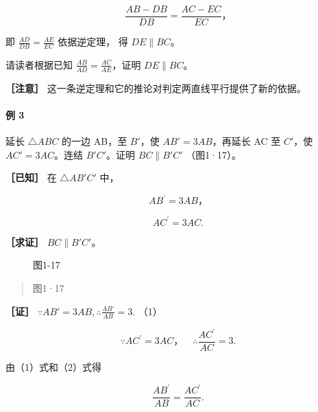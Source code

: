 \[
\frac {A B - D B}{D B} = \frac {A C - E C}{E C}\text{，}
\]

即 \(\frac{AD}{DB} = \frac{AE}{EC}\) 依据逆定理， 得
\(DE \parallel BC\)。

请读者根据已知 \(\frac{AB}{AD} = \frac{AC}{AE}\)，证明
\(DE \parallel BC\)。

\textbf{［注意］} 这一条逆定理和它的推论对判定两直线平行提供了新的依据。

\paragraph{例 3}

延长 \(\triangle ABC\) 的一边 AB，至 \(B'\)，使 \(AB' = 3AB\)，再延长 AC
至 \(C'\)，使 \(AC' = 3AC\)。连结 \(B'C'\)。证明 \(BC \parallel B'C'\)
（图1·17）。

\textbf{［已知］} 在 \(\triangle AB'C'\) 中，

\[
A B ^ {\prime} = 3 A B\text{，}
\]

\[
A C ^ {\prime} = 3 A C.
\]

\textbf{［求证］} \(BC \parallel B'C'\)。

\begin{figure}
\centering
{}
\caption{图1-17}
\end{figure}

\begin{quote}
图1·17
\end{quote}

\textbf{［证］} \(\because AB' = 3AB, \therefore \frac{AB'}{AB} = 3.\)
（1）

\[
\because A C ^ {\prime} = 3 A C\text{，} \quad \therefore \frac {A C ^ {\prime}}{A C} = 3. \tag {2}
\]

由（1）式和（2）式得

\[
\frac {A B ^ {\prime}}{A B} = \frac {A C ^ {\prime}}{A C}.
\]

